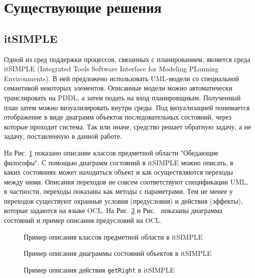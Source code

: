 \documentclass[a4paper,14pt]{extreport}
\begin{document}
   
\section*{Существующие решения}
    
\subsection*{itSIMPLE}
    Одной из сред поддержки процессов, связанных с планированием, является среда itSIMPLE \cite{itsimple} (Integrated Tools Software Interface for Modeling PLanning Environments). В ней предложено использовать UML-модели со специальной семантикой некоторых элементов. Описанные модели можно автоматически транслировать на PDDL, а затем подать на вход планировщикам. Полученный план затем можно визуализировать внутри среды. Под визуализацией понимается отображение в виде диаграмм объектов последовательных состояний, через которые проходит система. Так или иначе, средство решает обратную задачу, а не задачу, поставленную в данной работе.
    
    На Рис. \ref{img:its_phil_domain} показано описание классов предметной области  "Обедающие философы". С помощью диаграмм состояний в itSIMPLE можно описать, в каких состояниях может находиться объект и как осуществляются переходы между ними. Описания переходов не совсем соответствуют спецификации UML, в частности, переходы показаны как методы с параметрами. Тем не менее у переходов существуют охранные условия (предусловия) и действия (эффекты), которые задаются на языке OCL. На Рис. \ref{img:its_phil_precond} и Рис. \ показаны диаграмма состояний и пример описания предусловий на OCL.
    
    \begin{figure}[h]
        \caption{Пример описания классов предметной области в itSIMPLE}
        \label{img:its_phil_domain}

    \end{figure}
    
    \begin{figure}[h] 
        \caption{Пример описания диаграммы состояний объектов в itSIMPLE}
        \label{img:its_phil_states}

    \end{figure}
    
    \begin{figure}[h] 
        \caption{Пример описания действия \texttt{getRight} в itSIMPLE}
        \label{img:its_phil_precond}

    \end{figure}
        
\end{document}
